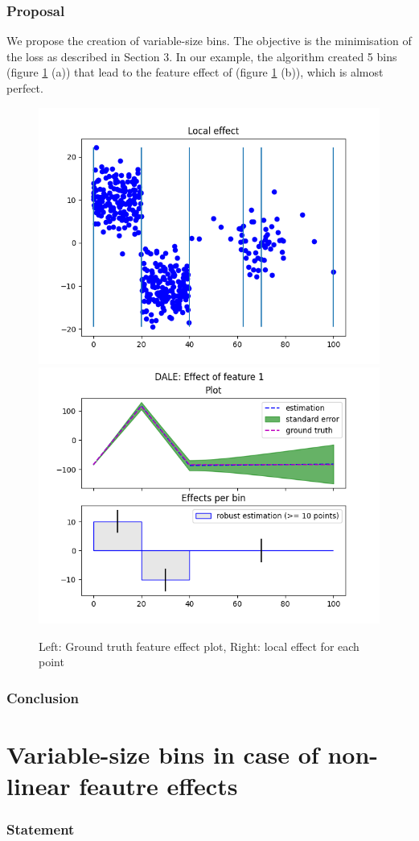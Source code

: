 \documentclass{article}
\begin{document}
\subsubsection*{Proposal}

We propose the creation of variable-size bins. The objective is the
minimisation of the loss as described in Section 3. In our example,
the algorithm created 5 bins (figure \ref{fig:bullet-3-im-3} (a)) that
lead to the feature effect of (figure \ref{fig:bullet-3-im-3} (b)),
which is almost perfect.

\begin{figure}[!h]
  \centering
  \includegraphics[width=.49\linewidth]{bullet_3/im_5.png}
  \includegraphics[width=.49\linewidth]{bullet_3/im_7.png}\\
  \caption{Left: Ground truth feature effect plot, Right: local effect for each point}
  \label{fig:bullet-3-im-3}
\end{figure}

\subsubsection*{Conclusion}

\section{Variable-size bins in case of non-linear feautre effects}

\subsubsection*{Statement}
\end{document}
